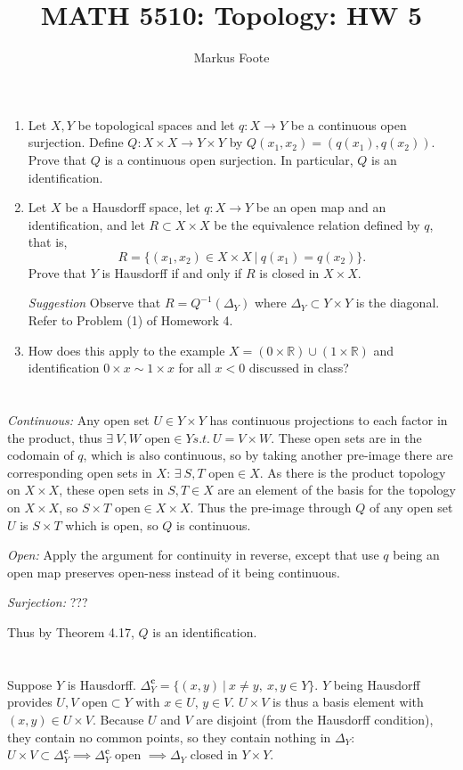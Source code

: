 \documentclass{jhwhw}
\title{MATH 5510: Topology: HW 5}
\author{Markus Foote}
\newcommand{\R}{{\mathbb R}}
\begin{document}
\problem{}%
\begin{enumerate}
	
	\item Let $X,Y$ be topological spaces and let $q:X\to Y$ be a continuous open surjection. Define 
	$Q:X\times X \to Y\times Y$ by  $Q(x_1,x_2) = (q(x_1),q(x_2)).$  
	Prove that $Q$ is a continuous open surjection.  In particular, $Q$ is an identification.
	\item Let $X$ be a Hausdorff space, let $q:X\to Y$ be an open map and an identification, and let $R\subset X\times X$ be the equivalence relation defined by $q$, that is,
	$$
	R = \{ (x_1,x_2)\in X\times X \ | \ q(x_1) = q(x_2) \}.
	$$
	Prove that $Y$ is Hausdorff if and only if $R$  is closed in $X\times X$. 
	
	\noindent\emph{Suggestion} Observe that  $R = Q^{-1}(\Delta_Y)$ where $\Delta_Y\subset Y\times Y$ is the diagonal.  Refer to Problem (1) of Homework 4.
	
	\item How does this apply to the example $X =( 0\times\R )\cup (1\times \R)$ and identification $0\times x \sim 1\times x$ for all $x<0$ discussed in class?
\end{enumerate}
\solution{}
\part{}%
\textit{Continuous:} Any open set $U \in Y\times Y$ has continuous projections to each factor in the product, thus $\exists\ V,W \text{ open} \in Y s.t.\ U=V\times W$. These open sets are in the codomain of $q$, which is also continuous, so by taking another pre-image there are corresponding open sets in $X$: $\exists\ S,T \text{ open} \in X$. As there is the product topology on $X\times X$, these open sets in $S,T\in X$ are an element of the basis for the topology on $X\times X$, so $S\times T \text{ open} \in X\times X$. Thus the pre-image through $Q$ of any open set $U$ is $S\times T$ which is open, so $Q$ is continuous.

 \textit{Open:} Apply the argument for continuity in reverse, except that use $q$ being an open map preserves open-ness instead of it being continuous.

 \textit{Surjection:} ???

\noindent Thus by Theorem 4.17, $Q$ is an identification.

\part{}%
\noindent Suppose $Y$ is Hausdorff. $\Delta_Y^{\mathbf{c}}=\{(x,y)\ | \ x\ne y,\ x,y\in Y\}$. $Y$ being Hausdorff provides $U,V\text{ open}\subset Y$ with $x\in U$, $y\in V$. $U\times V$ is thus a basis element with $(x,y) \in U\times V$. Because $U$ and $V$ are disjoint (from the Hausdorff condition), they contain no common points, so they contain nothing in $\Delta_Y$: $U\times V \subset \Delta_Y^{\mathbf{c}}\implies \Delta_Y^{\mathbf{c}}$ open $\implies \Delta_Y$ closed in $Y\times Y$.
\\
\end{document}
